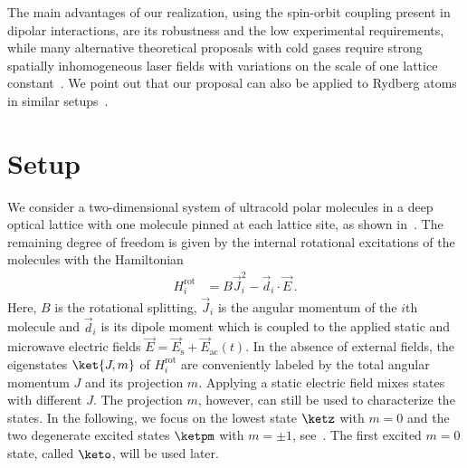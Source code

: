 The main advantages of our realization, using the spin-orbit coupling present in dipolar interactions, are its robustness and the low experimental requirements, while many alternative theoretical proposals with cold gases require strong spatially inhomogeneous laser fields with variations on the scale of one lattice constant~\cite{Liu2010,Stanescu2010,Goldman2013,Li2008,Yao2012,Yao2013,Goldman2013,Jaksch2003}.
We point out that our proposal can also be applied to Rydberg atoms in similar setups~\cite{Barredo2014,Piotrowicz2013,Nogrette2014}.

\section{Setup}

We consider a two-dimensional system of ultracold polar molecules in a deep optical lattice with one molecule pinned at each lattice site, as shown in~.
The remaining degree of freedom is given by the internal rotational excitations of the molecules with the Hamiltonian
\begin{align}
    H^{\text{rot}}_i &= B \vec{J}_i^2 - \vec{d}_i\cdot\vec{E}\,.
\end{align}
Here, $B$ is the rotational splitting, $\vec{J}_i$ is the angular momentum of the $i$th molecule and $\vec{d}_i$ is its dipole moment which is coupled to the applied static and microwave electric fields $\vec{E} = \vec{E}_{\text{s}} + \vec{E}_{\text{ac}}(t)$.
In the absence of external fields, the eigenstates $\ket{J,m}$ of $H^{\text{rot}}_{i}$ are conveniently labeled by the total angular momentum $J$ and its projection $m$.
Applying a static electric field mixes states with different $J$.
The projection $m$, however, can still be used to characterize the states.
In the following, we focus on the lowest state $\ketz$ with $m=0$ and the two degenerate excited states $\ketpm$ with $m = \pm 1$, see~.
The first excited $m=0$ state, called $\keto$, will be used later.


